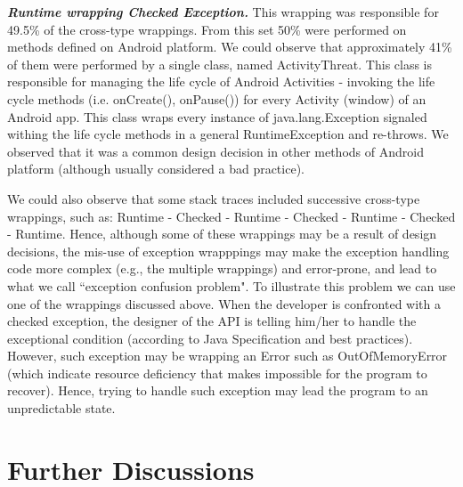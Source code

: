 \documentclass[conference]{IEEEtran}
\begin{document}
\emph{\textbf{Runtime wrapping Checked Exception.}} This wrapping was responsible for 49.5\% of
the cross-type wrappings.  From this set 50\%  were performed on methods defined on Android platform. 
We could observe that approximately 41\% of them were performed by a single class,
 named ActivityThreat. This class is responsible for managing the life cycle of  Android Activities - 
invoking the life cycle methods (i.e. onCreate(), onPause()) for every Activity 
(window) of an Android app. This class wraps every instance of java.lang.Exception 
signaled withing the life cycle methods in a general RuntimeException and re-throws. 
We observed that it was a common design decision in other methods of Android platform
(although usually considered a bad practice).

We could also observe that some stack traces included successive cross-type wrappings, 
such as: Runtime - Checked - Runtime - Checked - Runtime - Checked - Runtime. Hence, although some of these wrappings may be a result of design decisions,
the mis-use of exception wrapppings may make the exception handling 
code more complex (e.g., the multiple wrappings) and error-prone,
 and lead to what we call ``exception confusion problem". To illustrate this problem we can use one of the wrappings discussed above.
When the developer is confronted with a checked exception, the designer of the API is telling him/her 
to handle the exceptional condition (according to Java Specification and 
best practices). However, such exception may be wrapping an Error such as OutOfMemoryError (which indicate resource deficiency 
that makes impossible for the program to recover). Hence, trying to handle such exception  
may lead the program to an unpredictable state.

\noindent {}


\section{Further Discussions}
\label{sec:disc}

\end{document}
